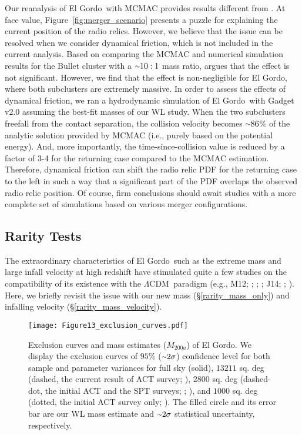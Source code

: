 \documentclass[twocolumn]{aastex631}
\newcommand{\elgordo}{El Gordo}
\newcommand{\LCDM}{$\Lambda$CDM}
\newcommand{\mytilde}{\raise.19ex\hbox{$\scriptstyle\sim$}}
\begin{document}
Our reanalysis of \elgordo~with MCMAC provides results different from \cite{Ng2015}. 
At face value, Figure~\ref{fig:merger_scenario} presents a puzzle for explaining the current position of the radio relics. 
However, we believe that the issue can be resolved when we consider dynamical friction, which is not included in the current analysis. 
Based on comparing the MCMAC and numerical simulation results for the Bullet cluster with a $\mytilde10:1$ mass ratio, \cite{MCMAC} argues that the effect is not significant. However, we find that the effect is non-negligible for \elgordo, where both subclusters are extremely massive. 
In order to assess the effects of dynamical friction, we ran a hydrodynamic simulation of \elgordo~with Gadget v2.0 assuming the best-fit masses of our WL study. 
When the two subclusters freefall from the contact separation, the collision velocity becomes $\mytilde86$\% of the analytic solution provided by MCMAC (i.e., purely based on the potential energy). 
And, more importantly, the time-since-collision value is reduced by a factor of 3-4 for the returning case compared to the MCMAC estimation. 
Therefore, dynamical friction can shift the radio relic PDF for the returning case to the left in such a way that a significant part of the PDF overlaps the observed radio relic position. 
Of course, firm conclusions should await studies with a more complete set of simulations based on various merger configurations. \\



\subsection{Rarity Tests} \label{rarity}
The extraordinary characteristics of \elgordo~such as the extreme mass and large infall velocity at high redshift have stimulated quite a few studies on the compatibility of its existence with the \LCDM~paradigm (e.g., M12; \citealt[][]{Waizmann2012a,Waizmann2012b}; \citealt{Harrison2012}; \citealt{Katz2013}; J14; \citealt{Sahlen2016}; \citealt{Asencio2021}). 
Here, we briefly revisit the issue with our new mass (\S\ref{rarity_mass_only}) and infalling velocity (\S\ref{rarity_mass_velocity}).



\begin{figure}
\centering
\texttt{[image: Figure13\_exclusion\_curves.pdf]}
\caption{Exclusion curves and mass estimates ($M_{200a}$) of \elgordo. 
We display the exclusion curves of $95$\% ($\mytilde2\sigma$) confidence level for both sample and parameter variances for full sky (solid), $13211$ sq. deg (dashed, the current result of ACT survey; \citealt{Hilton2021}), $2800$ sq. deg (dashed-dot, the initial ACT and the SPT surveys; \citealt{Hasselfield2013}; \citealt{Williamson2011}), and $1000$ sq. deg (dotted, the initial ACT survey only; \citealt{Hasselfield2013}).
The filled circle and its error bar are our WL mass estimate and $\mytilde2\sigma$ statistical uncertainty, respectively.}
\label{fig:exclusion_curve}
\end{figure}
\end{document}
